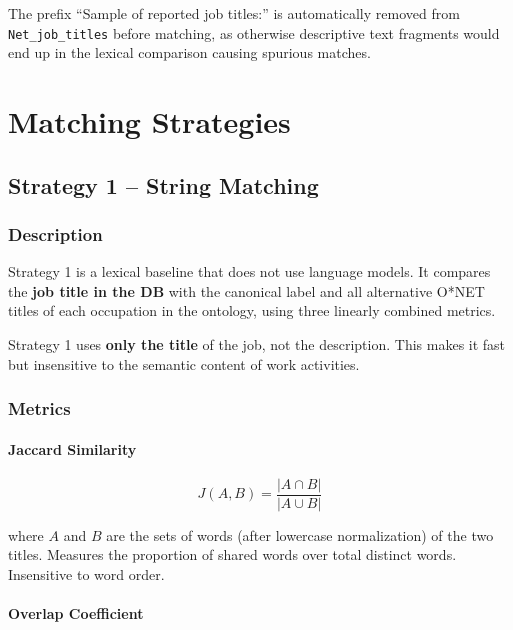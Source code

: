 \documentclass[12pt, a4paper]{report}
\begin{document}
The prefix ``Sample of reported job titles:'' is automatically removed
from \texttt{Net\_job\_titles} before matching,
as otherwise descriptive text fragments would end up in the
lexical comparison causing spurious matches.

% 
\chapter{Matching Strategies}
% 

\section{Strategy 1 -- String Matching}

\subsection{Description}

Strategy 1 is a lexical baseline that does not use language models.
It compares the \textbf{job title in the DB} with the canonical label
and all alternative O*NET titles of each occupation
in the ontology, using three linearly combined metrics.

\begin{notebox}
Strategy 1 uses \textbf{only the title} of the job, not the
description. This makes it fast but insensitive to the semantic
content of work activities.
\end{notebox}

\subsection{Metrics}

\subsubsection{Jaccard Similarity}

\begin{equation}
J(A, B) = \frac{|A \cap B|}{|A \cup B|}
\end{equation}

where $A$ and $B$ are the sets of words (after lowercase normalization)
of the two titles. Measures the proportion of shared words
over total distinct words. Insensitive to word order.

\subsubsection{Overlap Coefficient}
\end{document}
